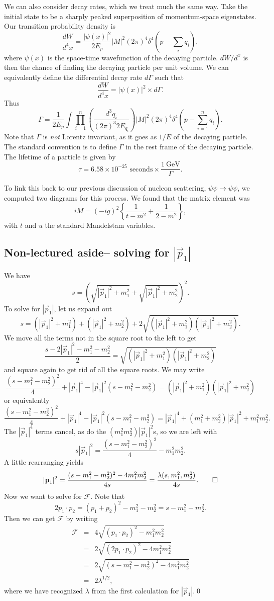 We can also consider decay rates, which we treat much the same way. Take the initial state to be a sharply peaked superposition of momentum-space eigenstates. Our transition probability density is
$$\frac{dW}{d^4x}=\frac{|\psi(x)|^2}{2E_p} |M|^2(2\pi)^4\delta^4(p-\sum_i q_i),$$
where $\psi(x)$ is the space-time wavefunction of the decaying particle. $dW/d^x$ is then the chance of finding the decaying particle per unit volume. We can equivalently define the differential decay rate $d\Gamma$ such that
$$\frac{dW}{d^4x}=|\psi(x)|^2 \times d\Gamma.$$
Thus
$$\Gamma=\frac{1}{2E_p}\int \prod_{i=1}^n \left(\frac{d^3 q_i}{(2\pi)^3 2E_{q_i}}\right)|M|^2(2\pi)^4 \delta^4(p-\sum_{i=1}^n q_i).$$
Note that $\Gamma$ is \emph{not} Lorentz invariant, as it goes as $1/E$ of the decaying particle. The standard convention is to define $\Gamma$ in the rest frame of the decaying particle. The lifetime of a particle is given by 
$$\tau=6.58\times 10^{-25}\text{ seconds}\times \frac{\SI{1}{\giga\electronvolt}}{\Gamma}.$$

To link this back to our previous discussion of nucleon scattering, $\psi\psi \to \psi\psi$, we computed two diagrams for this process. We found that the matrix element was
$$iM=(-ig)^2\left\{\frac{1}{t-m^2}+\frac{1}{2-m^2}\right\},$$
with $t$ and $u$ the standard Mandelstam variables. 

\subsection*{Non-lectured aside-- solving for $|\vec p_1|$} We have 
$$s=\left(\sqrt{|\vec p_1|^2+m_1^2}+\sqrt{|\vec p_1|^2+m_2^2}\right)^2.$$
To solve for $|\vec p_1|$, let us expand out 
$$s=(|\vec p_1|^2+m_1^2)+(|\vec p_1|^2+m_2^2)+2\sqrt{(|\vec p_1|^2+m_1^2)(|\vec p_1|^2+m_2^2)}.$$
We move all the terms not in the square root to the left to get
$$\frac{s-2|\vec p_1|^2-m_1^2-m_2^2}{2}=\sqrt{(|\vec p_1|^2+m_1^2)(|\vec p_1|^2+m_2^2)}$$
and square again to get rid of all the square roots. We may write
$$\frac{(s-m_1^2-m_2^2)^2}{4}+|\vec p_1|^4 -|\vec p_1|^2(s-m_1^2-m_2^2)=(|\vec p_1|^2+m_1^2)(|\vec p_1|^2+m_2^2)$$
or equivalently
$$\frac{(s-m_1^2-m_2^2)^2}{4}+|\vec p_1|^4 -|\vec p_1|^2(s-m_1^2-m_2^2)=|\vec p_1|^4 +(m_1^2+m_2^2)|\vec p_1|^2 +m_1^2m_2^2.$$
The $|\vec p_1|^4$ terms cancel, as do the $(m_1^2m_2^2)|\vec p_1|^2$s, so we are left with
$$s|\vec p_1|^2 =\frac{(s-m_1^2-m_2^2)^2}{4}-m_1^2m_2^2.$$
A little rearranging yields
$$|\vec p_1|^2 =\frac{(s-m_1^2-m_2^2)^2-4m_1^2 m_2^2}{4s}=\frac{\lambda(s,m_1^2,m_2^2)}{4s}.\qed$$
Now we want to solve for $\mathcal{F}$. Note that
$$2p_1\cdot p_2 = (p_1+p_2)^2-m_1^2-m_2^2=s-m_1^2-m_2^2.$$
Then we can get $\mathcal{F}$ by writing
\begin{eqnarray*}
\mathcal{F}&=&4\sqrt{(p_1\cdot p_2)^2-m_1^2m_2^2}\\
&=&2\sqrt{(2p_1\cdot p_2)^2-4m_1^2m_2^2}\\
&=&2\sqrt{(s-m_1^2-m_2^2)^2-4m_1^2m_2^2}\\
&=&2\lambda^{1/2},
\end{eqnarray*}
where we have recognized $\lambda$ from the first calculation for $|\vec p_1|.$\qed